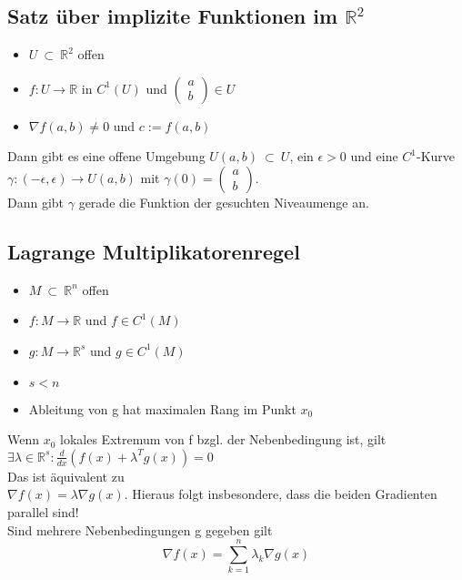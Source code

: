 


\subsection{Satz über implizite Funktionen im \texorpdfstring{$\mathbb{R}^2$}{R2}}
\begin{itemize}
    \item $U \ \subset \ \mathbb{R}^2$ offen
    \item $f: U\rightarrow \mathbb{R}$ in $C^1(U)$ und $\begin{pmatrix} a \\b  \end{pmatrix} \in U$
    \item $\nabla f(a,b)\neq 0$ und $c:=f(a,b)$
\end{itemize}
Dann gibt es eine offene Umgebung $U(a,b) \ \subset \ U$, ein $\epsilon > 0$ und eine $C^1$-Kurve $\gamma: (-\epsilon,\epsilon) \rightarrow U(a,b)$ mit $\gamma(0) = \begin{pmatrix} a \\b  \end{pmatrix}$.\\
Dann gibt $\gamma$ gerade die Funktion der gesuchten Niveaumenge an.

\subsection{Lagrange Multiplikatorenregel}
\begin{itemize}
    \item $M \ \subset \ \mathbb{R}^n$ offen
    \item $f: M \rightarrow \mathbb{R}$ und $f \in C^1(M)$
    \item $g: M \rightarrow \mathbb{R}^s$ und $g \in C^1(M)$
    \item $s<n$
    \item Ableitung von g hat maximalen Rang im Punkt $x_0$
\end{itemize}
Wenn $x_0$ lokales Extremum von f bzgl. der Nebenbedingung ist, gilt\\
$\exists \lambda \in \mathbb{R}^s: \frac{d}{dx}(f(x)+\lambda^T g(x)) = 0$\\
Das ist äquivalent zu \\
$\nabla f(x) = \lambda \nabla g(x)$. Hieraus folgt insbesondere, dass die beiden Gradienten parallel sind!\\
Sind mehrere Nebenbedingungen g gegeben gilt
\begin{equation*}
   \nabla f(x) = \sum_{k=1}^{n} \lambda_k \nabla g(x)
\end{equation*}


